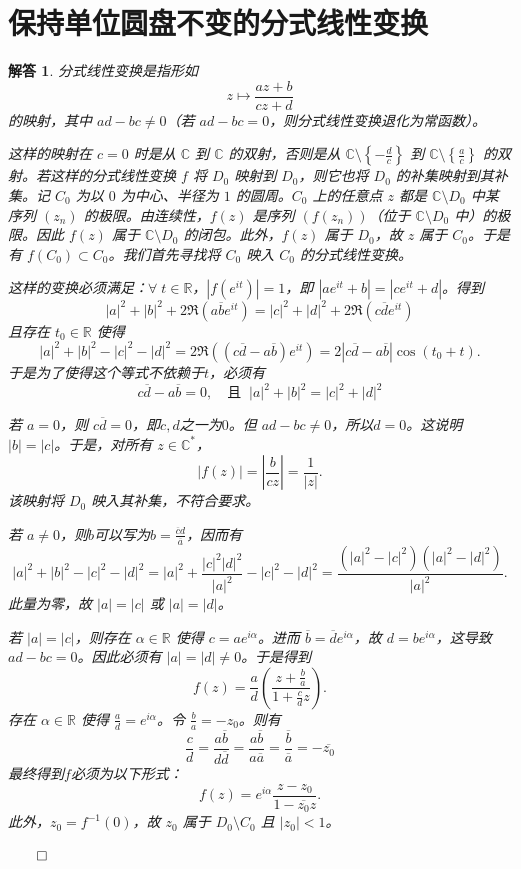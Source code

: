 \documentclass[12pt,UTF8,fontset=none]{ctexbook}
\theoremstyle{exercisestyle}
\theoremstyle{solutionstyle}
\newtheorem*{solution*}{解答}
\newenvironment{solution}
  {\begin{solution*}}
  {\hfill\ensuremath{\qed}\end{solution*}}
\begin{document}
\section{保持单位圆盘不变的分式线性变换}
\begin{solution}
分式线性变换是指形如 
$$ z \mapsto \frac{az+b}{cz+d} $$
的映射，其中 \( ad - bc \neq 0 \)（若 \( ad - bc = 0 \)，则分式线性变换退化为常函数）。

这样的映射在 \( c=0 \) 时是从 \( \mathbb{C} \) 到 \( \mathbb{C} \) 的双射，否则是从 \( \mathbb{C} \setminus \left\{ -\frac{d}{c} \right\} \) 到 \( \mathbb{C} \setminus \left\{ \frac{a}{c} \right\} \) 的双射。若这样的分式线性变换 \( f \) 将 \( D_0 \) 映射到 \( D_0 \)，则它也将 \( D_0 \) 的补集映射到其补集。记 \( C_0 \) 为以 \( 0 \) 为中心、半径为 \( 1 \) 的圆周。\( C_0 \) 上的任意点 \( z \) 都是 \( \mathbb{C} \setminus D_0 \) 中某序列 \( (z_n) \) 的极限。由连续性，\( f(z) \) 是序列 \( (f(z_n)) \)（位于 \( \mathbb{C} \setminus D_0 \) 中）的极限。因此 \( f(z) \) 属于 \( \mathbb{C} \setminus D_0 \) 的闭包。此外，\( f(z) \) 属于 \( D_0 \)，故 \( z \) 属于 \( C_0 \)。于是有 \( f(C_0) \subset C_0 \)。我们首先寻找将 \( C_0 \) 映入 \( C_0 \) 的分式线性变换。

这样的变换必须满足：\(\forall\; t \in \mathbb{R} \)，\( |f(e^{it})| = 1 \)，即 \( |a e^{it} + b| = |c e^{it} + d| \)。得到
\[
|a|^2 + |b|^2 + 2 \Re(a \overline{b} e^{it}) = |c|^2 + |d|^2 + 2 \Re(c \overline{d} e^{it})
\]
且存在 \( t_0 \in \mathbb{R} \) 使得
\[
|a|^2 + |b|^2 - |c|^2 - |d|^2 = 2 \Re\left( (c \overline{d} - a \overline{b}) e^{it} \right) = 2 \left| c \overline{d} - a \overline{b} \right| \cos(t_0 + t).
\]
于是为了使得这个等式不依赖于$t$，必须有
\[
c \overline{d} - a \overline{b} = 0 ,\quad \mbox{且}\;\; |a|^2 + |b|^2 = |c|^2 + |d|^2
\]

若 \( a = 0 \)，则 \( c\overline{d} = 0 \)，即$c,d$之一为$0$。但 \( ad - bc \neq 0 \)，所以$d = 0$。这说明 \( |b| = |c| \)。于是，对所有 \( z \in \mathbb{C}^* \)，
\[
|f(z)| = \left| \frac{b}{c z} \right| = \frac{1}{|z|}.
\]
该映射将 \( D_0 \) 映入其补集，不符合要求。

若 \( a \neq 0 \)，则$b$可以写为\(\displaystyle b = \frac{\overline{c} d}{\overline{a}} \)，因而有
\[
|a|^2 + |b|^2 - |c|^2 - |d|^2 = |a|^2 + \frac{|c|^2 |d|^2}{|a|^2} - |c|^2 - |d|^2 = \frac{(|a|^2 - |c|^2)(|a|^2 - |d|^2)}{|a|^2}.
\]
此量为零，故 \( |a| = |c| \) 或 \( |a| = |d| \)。

若 \( |a| = |c| \)，则存在 \( \alpha \in \mathbb{R} \) 使得 \( c = a e^{i\alpha} \)。进而 \( \overline{b} = \overline{d} e^{i\alpha} \)，故 \( d = b e^{i\alpha} \)，这导致 \( ad - bc = 0 \)。因此必须有 \( |a| = |d| \neq 0 \)。于是得到
\[
f(z) = \frac{a}{d} \left( \frac{z + \frac{b}{a}}{1 + \frac{c}{d} z} \right).
\]
存在 \( \alpha \in \mathbb{R} \) 使得 \( \frac{a}{d} = e^{i\alpha} \)。令 \( \frac{b}{a} = -z_0 \)。则有
\[
\frac{c}{d} = \frac{a \overline{b}}{d \overline{d}} = \frac{a \overline{b}}{a \overline{a}} = \frac{\overline{b}}{\overline{a}} = -\overline{z_0}
\]
最终得到$f$必须为以下形式：
\[
f(z) = e^{i\alpha} \frac{z - z_0}{1 - \overline{z_0} z}.
\]
此外，\( z_0 = f^{-1}(0) \)，故 \( z_0 \) 属于 \( D_0 \setminus C_0 \) 且 \( |z_0| < 1 \)。


\end{solution}
\end{document}

